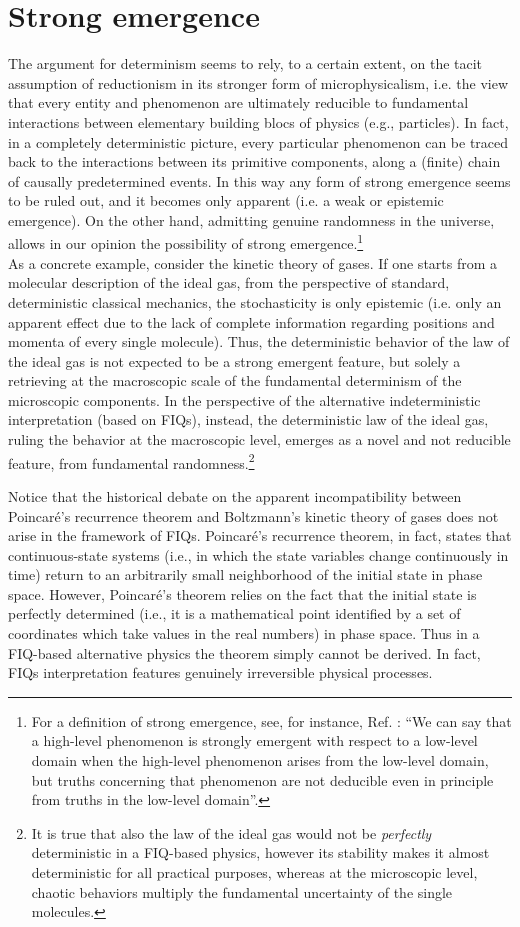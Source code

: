 \documentclass[12pt]{article}
\begin{document}
\section{Strong emergence}
The argument for determinism seems to rely, to a certain extent, on the tacit assumption of reductionism in its stronger form of microphysicalism, i.e. the view that every entity and phenomenon are ultimately reducible to fundamental interactions between elementary building blocs of physics (e.g., particles). In fact, in a completely deterministic picture, every particular phenomenon can be traced back to the interactions between its primitive components, along a (finite) chain of causally predetermined events. In this way any form of strong emergence seems to be ruled out, and it becomes only apparent (i.e. a weak or epistemic emergence). On the other hand, admitting genuine randomness in the universe, allows in our opinion the possibility of strong emergence.\footnote{For a definition of strong emergence, see, for instance, Ref. \cite{chalmers}: ``We can say that a high-level phenomenon is strongly emergent with respect to a
low-level domain when the high-level phenomenon arises from the low-level domain, but truths concerning that phenomenon are not deducible even in principle from truths in the low-level domain''.}\\
As a concrete example, consider the kinetic theory of gases. If one starts from a molecular description of the ideal gas, from the perspective of standard, deterministic classical mechanics, the stochasticity is only epistemic (i.e. only an apparent effect due to the lack of complete information regarding positions and momenta of every single molecule). Thus, the deterministic behavior of the law of the ideal gas is not expected to be a strong emergent feature, but solely a retrieving at the macroscopic scale of the fundamental determinism of the microscopic components.
In the perspective of the alternative indeterministic interpretation (based on FIQs), instead, the deterministic law of the ideal gas, ruling the behavior at the macroscopic level, emerges as a novel and not reducible feature, from fundamental randomness.\footnote{It is true that also the law of the ideal gas would not be \emph{perfectly} deterministic in a FIQ-based physics, however its stability makes it almost deterministic for all practical purposes, whereas at the microscopic level, chaotic behaviors multiply the fundamental uncertainty of the single molecules.}

Notice that the historical debate on the apparent incompatibility between Poincar\'e's recurrence theorem and Boltzmann's kinetic theory of gases does not arise in the framework of FIQs. Poincar\'e's recurrence theorem, in fact, states that continuous-state systems (i.e., in which the state variables change continuously in time) return to an arbitrarily small neighborhood of the initial state in phase space. However, Poincar\'e's theorem relies on the fact that the initial state is perfectly determined (i.e., it is a mathematical point identified by a set of coordinates which take values in the real numbers) in phase space. Thus in a FIQ-based alternative physics the theorem simply cannot be derived. In fact, FIQs interpretation features genuinely irreversible physical processes. 
\end{document}
